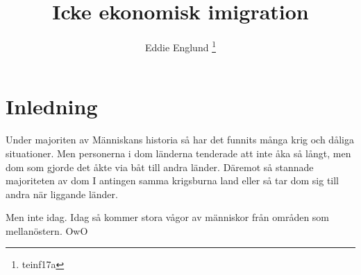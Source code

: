 \documentclass[12pt]{article}
\author{Eddie Englund \thanks{teinf17a}}
\title{Icke ekonomisk imigration}
\begin{document}
    
    \maketitle

    \section{Inledning}

    Under majoriten av Människans historia så har det funnits många krig och dåliga situationer. Men personerna i dom länderna tenderade att inte åka så långt, men dom som gjorde det åkte via båt till andra länder. Däremot så stannade majoriteten av dom I antingen samma krigsburna land eller så tar dom sig till andra när liggande länder.

    Men inte idag. Idag så kommer stora vågor av människor från områden som mellanöstern\cite{Guardian}. OwO
\end{document}
